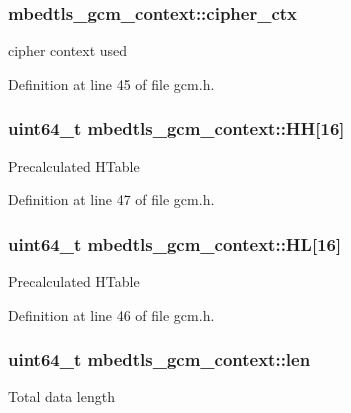 \hypertarget{structmbedtls__gcm__context_a3687a336bb05c025fb3861ca99cd945d}{
\subsubsection[{cipher\-\_\-ctx}]{ mbedtls\-\_\-gcm\-\_\-context\-::cipher\-\_\-ctx}}\label{structmbedtls__gcm__context_a3687a336bb05c025fb3861ca99cd945d}
cipher context used 

Definition at line 45 of file gcm.\-h.

\hypertarget{structmbedtls__gcm__context_a5935337c8028cc6fec0c5b9c7d0d4fd8}{
\subsubsection[{H\-H}]{\setlength{\rightskip}{0pt plus 5cm}uint64\-\_\-t mbedtls\-\_\-gcm\-\_\-context\-::\-H\-H\mbox{[}16\mbox{]}}}\label{structmbedtls__gcm__context_a5935337c8028cc6fec0c5b9c7d0d4fd8}
Precalculated H\-Table 

Definition at line 47 of file gcm.\-h.

\hypertarget{structmbedtls__gcm__context_af5731ab9002f0b1b913e66071e1138fc}{
\subsubsection[{H\-L}]{\setlength{\rightskip}{0pt plus 5cm}uint64\-\_\-t mbedtls\-\_\-gcm\-\_\-context\-::\-H\-L\mbox{[}16\mbox{]}}}\label{structmbedtls__gcm__context_af5731ab9002f0b1b913e66071e1138fc}
Precalculated H\-Table 

Definition at line 46 of file gcm.\-h.

\hypertarget{structmbedtls__gcm__context_a7ca348b10a75f1ab46f7c5067c1ab6e7}{
\subsubsection[{len}]{\setlength{\rightskip}{0pt plus 5cm}uint64\-\_\-t mbedtls\-\_\-gcm\-\_\-context\-::len}}\label{structmbedtls__gcm__context_a7ca348b10a75f1ab46f7c5067c1ab6e7}
Total data length 

